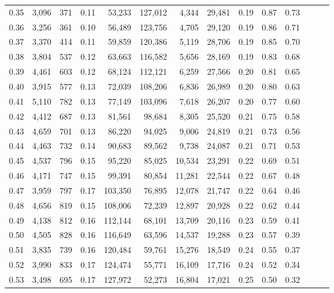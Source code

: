 \begin{tabular}{rrrrrrrrrrrrrr}
0.35 &  3,096 &  371 &  0.11 &   53,233 &  127,012 &   4,344 &  29,481 &  0.19 &  0.87 &      0.73 \\
0.36 &  3,256 &  361 &  0.10 &   56,489 &  123,756 &   4,705 &  29,120 &  0.19 &  0.86 &      0.71 \\
0.37 &  3,370 &  414 &  0.11 &   59,859 &  120,386 &   5,119 &  28,706 &  0.19 &  0.85 &      0.70 \\
0.38 &  3,804 &  537 &  0.12 &   63,663 &  116,582 &   5,656 &  28,169 &  0.19 &  0.83 &      0.68 \\
0.39 &  4,461 &  603 &  0.12 &   68,124 &  112,121 &   6,259 &  27,566 &  0.20 &  0.81 &      0.65 \\
0.40 &  3,915 &  577 &  0.13 &   72,039 &  108,206 &   6,836 &  26,989 &  0.20 &  0.80 &      0.63 \\
0.41 &  5,110 &  782 &  0.13 &   77,149 &  103,096 &   7,618 &  26,207 &  0.20 &  0.77 &      0.60 \\
0.42 &  4,412 &  687 &  0.13 &   81,561 &   98,684 &   8,305 &  25,520 &  0.21 &  0.75 &      0.58 \\
0.43 &  4,659 &  701 &  0.13 &   86,220 &   94,025 &   9,006 &  24,819 &  0.21 &  0.73 &      0.56 \\
0.44 &  4,463 &  732 &  0.14 &   90,683 &   89,562 &   9,738 &  24,087 &  0.21 &  0.71 &      0.53 \\
0.45 &  4,537 &  796 &  0.15 &   95,220 &   85,025 &  10,534 &  23,291 &  0.22 &  0.69 &      0.51 \\
0.46 &  4,171 &  747 &  0.15 &   99,391 &   80,854 &  11,281 &  22,544 &  0.22 &  0.67 &      0.48 \\
0.47 &  3,959 &  797 &  0.17 &  103,350 &   76,895 &  12,078 &  21,747 &  0.22 &  0.64 &      0.46 \\
0.48 &  4,656 &  819 &  0.15 &  108,006 &   72,239 &  12,897 &  20,928 &  0.22 &  0.62 &      0.44 \\
0.49 &  4,138 &  812 &  0.16 &  112,144 &   68,101 &  13,709 &  20,116 &  0.23 &  0.59 &      0.41 \\
0.50 &  4,505 &  828 &  0.16 &  116,649 &   63,596 &  14,537 &  19,288 &  0.23 &  0.57 &      0.39 \\
0.51 &  3,835 &  739 &  0.16 &  120,484 &   59,761 &  15,276 &  18,549 &  0.24 &  0.55 &      0.37 \\
0.52 &  3,990 &  833 &  0.17 &  124,474 &   55,771 &  16,109 &  17,716 &  0.24 &  0.52 &      0.34 \\
0.53 &  3,498 &  695 &  0.17 &  127,972 &   52,273 &  16,804 &  17,021 &  0.25 &  0.50 &      0.32 \\

\end{tabular}
